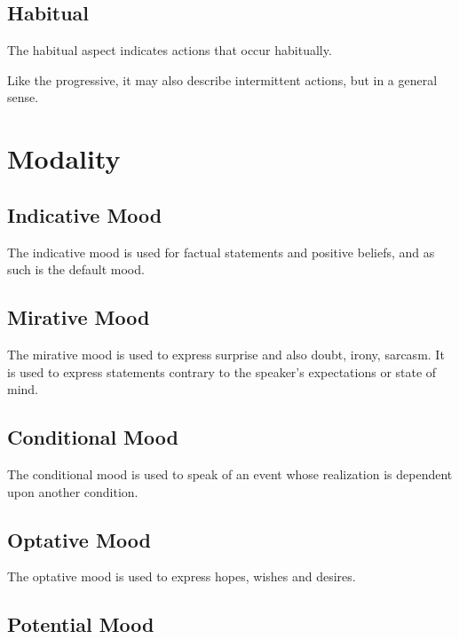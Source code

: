 \documentclass[grammar]{subfiles}
\begin{document}

\subsection{Habitual}
\label{vp:ssec_habitual}

The habitual aspect indicates actions that occur habitually.  

Like the
progressive, it may also describe intermittent actions, but in a general sense.


\section{Modality}
\label{sec:vp_modality}


\subsection{Indicative Mood}
\label{ssec:vp_indicative}

The indicative mood is used for factual statements and positive beliefs,
and as such is the default mood.  


\subsection{Mirative Mood}
\label{ssec:vp_mirative}

The mirative mood is used to express surprise and also doubt, irony,
sarcasm.  It is used to express statements contrary to the speaker’s
expectations or state of mind.


\subsection{Conditional Mood}
\label{ssec:vp_conditional}

The conditional mood is used to speak of an event whose realization is
dependent upon another condition. 


\subsection{Optative Mood}
\label{ssec:vp_optative}

The optative mood is used to express hopes, wishes and desires.


\subsection{Potential Mood}
\label{ssec:vp_potential}
\end{document}
